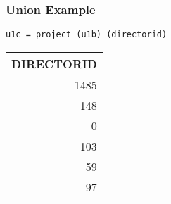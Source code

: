\documentclass[dvipsnames]{beamer}
\theoremstyle{plain}
\begin{document}
\begin{frame}[fragile]
  \frametitle{Union Example}

  \begin{example}
    \begin{lstlisting}
u1c = project (u1b) (directorid)
    \end{lstlisting}

    \pause
    \begin{tiny}
    \begin{table}
      \begin{tabular}{|r|}\hline
DIRECTORID\\\hline\hline
      1485\\\hline
       148\\\hline
         0\\\hline
       103\\\hline
        59\\\hline
        97\\\hline
      \end{tabular}
    \end{table}
    \end{tiny}
  \end{example}
\end{frame}
\end{document}
